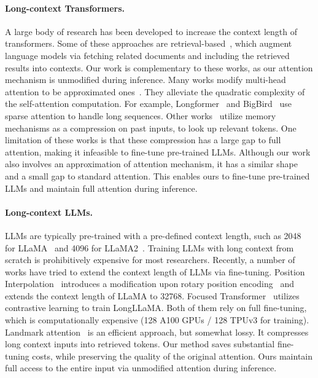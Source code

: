 \documentclass{article} %
\begin{document}
\paragraph{Long-context Transformers.}
A large body of research has been developed to increase the context length of transformers. Some of these approaches are retrieval-based~\citep{retrieval-QA, few-shot-retrieval, realm}, which augment language models via fetching related documents and including the retrieved results into contexts. Our work is complementary to these works, as our attention mechanism is unmodified during inference.
Many works modify multi-head attention to be approximated ones~\citep{linformer, long-former, big-bird, reformer, recurrent-memory-transformer, longnet, block-wise-self-attention}. They alleviate the quadratic complexity of the self-attention computation. For example, Longformer~\citep{long-former} and BigBird~\citep{big-bird} use sparse attention to handle long sequences. Other works~\citep{memorizing-transformer, recurrent-memory-transformer} utilize memory mechanisms as a compression on past inputs, to look up relevant tokens. One limitation of these works is that these compression has a large gap to full attention, making it infeasible to fine-tune pre-trained LLMs.
Although our work also involves an approximation of attention mechanism, it has a similar shape and a small gap to standard attention. This enables ours to fine-tune pre-trained LLMs and maintain full attention during inference.

\paragraph{Long-context LLMs.}
LLMs are typically pre-trained with a pre-defined context length, such as 2048 for LLaMA~\citep{llama} and 4096 for LLaMA2~\citep{llama2}. Training LLMs with long context from
scratch is prohibitively expensive for most researchers.
Recently, a number of works have tried to extend the context length of LLMs via fine-tuning. Position Interpolation~\citep{position-interpolation} introduces a modification upon rotary position encoding~\citep{rope} and extends the context length of LLaMA to 32768. Focused Transformer~\citep{focused-transformer} utilizes contrastive learning to train LongLLaMA. Both of them rely on full fine-tuning, which is computationally expensive (128 A100 GPUs / 128 TPUv3 for training). Landmark attention~\citep{landmark-attention} is an efficient approach, but somewhat lossy. It compresses long context inputs into retrieved tokens. Our method saves substantial fine-tuning costs, while preserving the quality of the original attention.  Ours maintain full access to the entire input via unmodified attention during inference.
\end{document}
